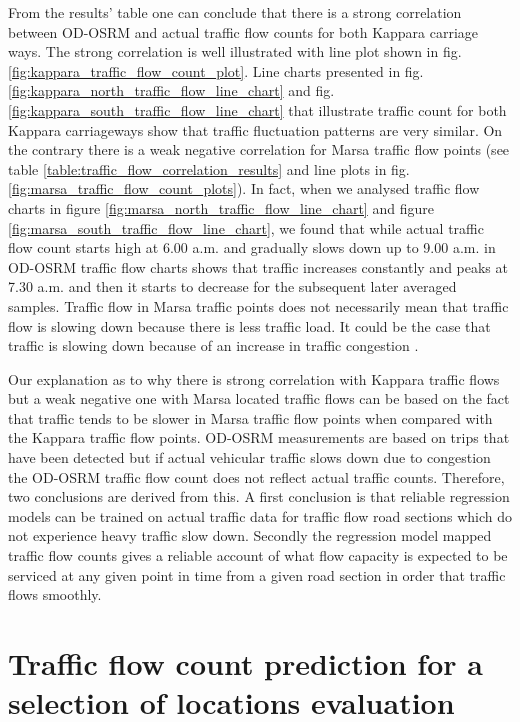 \documentclass[12pt, a4paper]{report}
\theoremstyle{definition}
\theoremstyle{definition}%
\theoremstyle{definition}%
\theoremstyle{definition}%
\theoremstyle{definition}%
\theoremstyle{definition}%
\begin{document}
From the results' table one can conclude that there is a strong correlation between OD-OSRM and actual traffic flow counts for both Kappara carriage ways. The strong correlation is well illustrated with line plot shown in fig. \ref{fig:kappara_traffic_flow_count_plot}. Line charts presented in fig. \ref{fig:kappara_north_traffic_flow_line_chart} and fig. \ref{fig:kappara_south_traffic_flow_line_chart} that illustrate traffic count for both Kappara carriageways show that traffic fluctuation patterns are very similar. On the contrary there is a weak negative correlation for Marsa traffic flow points (see table \ref{table:traffic_flow_correlation_results} and line plots in fig. \ref{fig:marsa_traffic_flow_count_plots}). In fact, when we analysed traffic flow charts in figure \ref{fig:marsa_north_traffic_flow_line_chart} and figure \ref{fig:marsa_south_traffic_flow_line_chart},  we found that while actual traffic flow count starts high at 6.00 a.m. and gradually slows down up to 9.00 a.m. in OD-OSRM traffic flow charts shows that traffic increases constantly and peaks at 7.30 a.m. and then it starts to decrease for the subsequent later averaged samples. Traffic flow in Marsa traffic points does not necessarily mean that traffic flow is slowing down because there is less traffic load. It could be the case that traffic is slowing down because of an increase in traffic congestion \cite{Pace2017}.

Our explanation as to why there is strong correlation with Kappara traffic flows but a weak negative one with Marsa located traffic flows can be based on the fact that traffic tends to be slower in Marsa traffic flow points when compared with the Kappara traffic flow points. OD-OSRM measurements are based on trips that have been detected but if actual vehicular traffic slows down due to congestion the OD-OSRM traffic flow count does not reflect actual traffic counts. Therefore, two conclusions are derived from this. A first conclusion is that reliable regression models can be trained on actual traffic data for traffic flow road sections which do not experience heavy traffic slow down.  Secondly the regression model mapped traffic flow counts gives a reliable account of what flow capacity is expected to be serviced at any given point in time from a given road section in order that traffic flows smoothly. 

\section{Traffic flow count prediction for a selection of locations evaluation}
\end{document}
